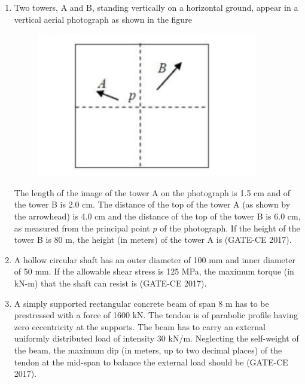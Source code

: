 \documentclass[journal,12pt,onecolumn]{article}
\theoremstyle{remark}
\begin{document}
\begin{enumerate}
    \item Two towers, A and B, standing vertically on a horizontal ground, appear in a vertical aerial photograph as shown in the figure 
    \begin{figure}[H]
    \centering
    \includegraphics[width=0.7\columnwidth]{q38.jpg}  
    \caption{}
    \label{fig:10}
    \end{figure}
    The length of the image of the tower A on the photograph is 1.5 cm and of the tower B is 2.0 cm. The distance of the top of the tower A (as shown by the arrowhead) is 4.0 cm and the distance of the top of the tower B is 6.0 cm, as measured from the principal point $ p $ of the photograph. If the height of the tower B is 80 m, the height (in meters) of the tower A is \underline{\hspace{3cm}} \hfill (GATE-CE 2017).

    \item A hollow circular shaft has an outer diameter of 100 mm and inner diameter of 50 mm. If the allowable shear stress is 125 MPa, the maximum torque (in kN-m) that the shaft can resist is \underline{\hspace{3cm}} \hfill (GATE-CE 2017).

    \item A simply supported rectangular concrete beam of span 8 m has to be prestressed with a force of 1600 kN. The tendon is of parabolic profile having zero eccentricity at the supports. The beam has to carry an external uniformly distributed load of intensity 30 kN/m. Neglecting the self-weight of the beam, the maximum dip (in meters, up to two decimal places) of the tendon at the mid-span to balance the external load should be \underline{\hspace{3cm}} \hfill (GATE-CE 2017).


\end{enumerate}
\end{document}
